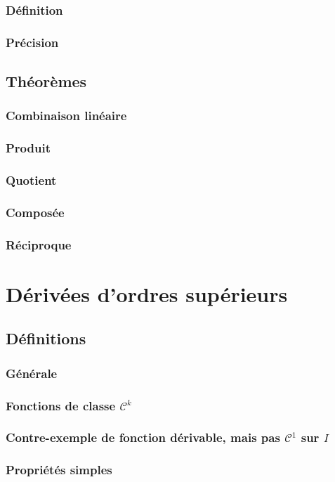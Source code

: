 \documentclass[12pt,a4paper,french]{book}
\begin{document}
			\subsubsection{Définition}
			\subsubsection{Précision}
		\subsection{Théorèmes}
			\subsubsection{Combinaison linéaire}
			\subsubsection{Produit}
			\subsubsection{Quotient}
			\subsubsection{Composée}
			\subsubsection{Réciproque}
	\section{Dérivées d'ordres supérieurs}
		\subsection{Définitions}
			\subsubsection{Générale}
			\subsubsection{Fonctions de classe $\mathcal{C}^{k}$}
			\subsubsection{Contre-exemple de fonction dérivable, mais pas $\mathcal{C}^{1}$ sur $I$}
			\subsubsection{Propriétés simples}
\end{document}
